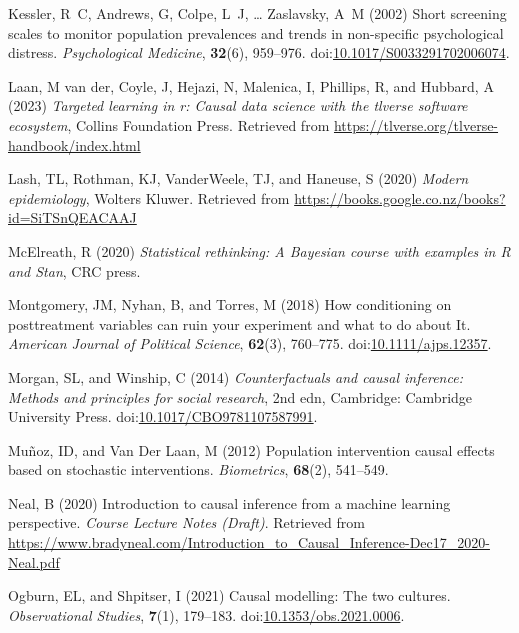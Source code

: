 \documentclass[
  single column]{article}
\newlength{\cslhangindent}
\newenvironment{CSLReferences}[2] %
 {\begin{list}{}{%
  \setlength{\itemindent}{0pt}
  \setlength{\leftmargin}{0pt}
  \setlength{\parsep}{0pt}
  \ifodd #1
   \setlength{\leftmargin}{\cslhangindent}
   \setlength{\itemindent}{-1\cslhangindent}
  \fi
  \setlength{\itemsep}{#2\baselineskip}}}
 {\end{list}}
\begin{document}
\begin{CSLReferences}{1}{0}
Kessler, R~C, Andrews, G, Colpe, L~J, \ldots{} Zaslavsky, A~M (2002)
Short screening scales to monitor population prevalences and trends in
non-specific psychological distress. \emph{Psychological Medicine},
\textbf{32}(6), 959--976.
doi:\href{https://doi.org/10.1017/S0033291702006074}{10.1017/S0033291702006074}.

Laan, M van der, Coyle, J, Hejazi, N, Malenica, I, Phillips, R, and
Hubbard, A (2023) \emph{Targeted learning in r: Causal data science with
the tlverse software ecosystem}, Collins Foundation Press. Retrieved
from \url{https://tlverse.org/tlverse-handbook/index.html}

Lash, TL, Rothman, KJ, VanderWeele, TJ, and Haneuse, S (2020)
\emph{Modern epidemiology}, Wolters Kluwer. Retrieved from
\url{https://books.google.co.nz/books?id=SiTSnQEACAAJ}

McElreath, R (2020) \emph{Statistical rethinking: A {B}ayesian course
with examples in {R} and {S}tan}, CRC press.

Montgomery, JM, Nyhan, B, and Torres, M (2018) How conditioning on
posttreatment variables can ruin your experiment and what to do about
It. \emph{American Journal of Political Science}, \textbf{62}(3),
760--775.
doi:\href{https://doi.org/10.1111/ajps.12357}{10.1111/ajps.12357}.

Morgan, SL, and Winship, C (2014) \emph{Counterfactuals and causal
inference: Methods and principles for social research}, 2nd edn,
Cambridge: Cambridge University Press.
doi:\href{https://doi.org/10.1017/CBO9781107587991}{10.1017/CBO9781107587991}.

Muñoz, ID, and Van Der Laan, M (2012) Population intervention causal
effects based on stochastic interventions. \emph{Biometrics},
\textbf{68}(2), 541--549.

Neal, B (2020) Introduction to causal inference from a machine learning
perspective. \emph{Course Lecture Notes (Draft)}. Retrieved from
\url{https://www.bradyneal.com/Introduction_to_Causal_Inference-Dec17_2020-Neal.pdf}

Ogburn, EL, and Shpitser, I (2021) Causal modelling: The two cultures.
\emph{Observational Studies}, \textbf{7}(1), 179--183.
doi:\href{https://doi.org/10.1353/obs.2021.0006}{10.1353/obs.2021.0006}.


\end{CSLReferences}
\end{document}
